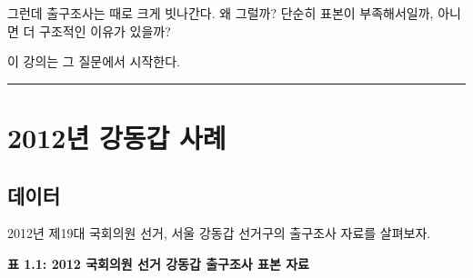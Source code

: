 \documentclass[
  letterpaper,
  DIV=11,
  numbers=noendperiod]{scrreprt}
\begin{document}
그런데 출구조사는 때로 크게 빗나간다. 왜 그럴까? 단순히 표본이
부족해서일까, 아니면 더 구조적인 이유가 있을까?

이 강의는 그 질문에서 시작한다.

\begin{center}\rule{0.5\linewidth}{0.5pt}\end{center}

\section{2012년 강동갑
사례}\label{uxb144-uxac15uxb3d9uxac11-uxc0acuxb840}

\subsection{데이터}\label{uxb370uxc774uxd130}

2012년 제19대 국회의원 선거, 서울 강동갑 선거구의 출구조사 자료를
살펴보자.

\textbf{표 1.1: 2012 국회의원 선거 강동갑 출구조사 표본 자료}
\end{document}
